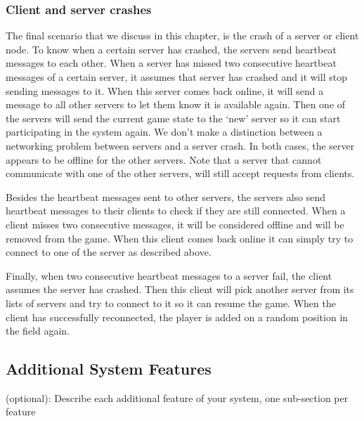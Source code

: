\subsubsection{Client and server crashes}
\label{subsubsec:client_server_crashes}
The final scenario that we discuss in this chapter, is the crash of a server or client node. 
To know when a certain server has crashed, the servers send heartbeat messages to each other. 
When a server has missed two consecutive heartbeat messages of a certain server, it assumes that server has crashed and it will stop sending messages to it.
When this server comes back online, it will send a message to all other servers to let them know it is available again. 
Then one of the servers will send the current game state to the `new' server so it can start participating in the system again.
We don't make a distinction between a networking problem between servers and a server crash. 
In both cases, the server appears to be offline for the other servers. 
Note that a server that cannot communicate with one of the other servers, will still accept requests from clients.

Besides the heartbeat messages sent to other servers, the servers also send heartbeat messages to their clients to check if they are still connected. 
When a client misses two consecutive messages, it will be considered offline and will be removed from the game.
When this client comes back online it can simply try to connect to one of the server as described above.

Finally, when two consecutive heartbeat messages to a server fail, the client assumes the server has crashed. 
Then this client will pick another server from its lists of servers and try to connect to it so it can resume the game. 
When the client has successfully reconnected, the player is added on a random position in the field again.

\subsection{Additional System Features}
\label{subsec:additional_features}
(optional): Describe each additional feature of your system, one sub-section per feature
 
